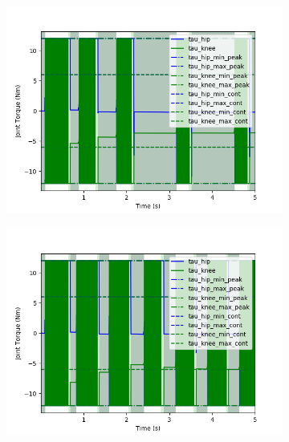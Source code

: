 \documentclass[onecolumn, letter paper]{report}
\begin{document}
\begin{figure}[htb!]
    \centering
    \begin{subfigure}{.49\textwidth}
    \centering
    \includegraphics[width=\textwidth]{figures/sim0.4m/joint_efforts.png}
    \end{subfigure}
    \begin{subfigure}{.49\textwidth}
    \centering
    \includegraphics[width=\textwidth]{figures/sim0.5m/joint_efforts.png}
    \end{subfigure}
    \begin{subfigure}{.49\textwidth}
    \centering

\end{subfigure}
\end{figure}
\end{document}
